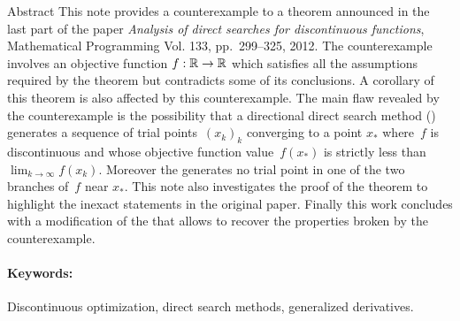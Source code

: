  

\GDcoverpage

\begin{GDtitlepage}

\begin{GDauthlist}
\end{GDauthlist}

\begin{GDaffillist}
\end{GDaffillist}

\begin{GDemaillist}
\end{GDemaillist}

\end{GDtitlepage}


\GDabstracts

\begin{GDabstract}{Abstract}
This note provides a counterexample to a theorem announced in the last part of the paper \textit{Analysis of direct searches for discontinuous functions}, Mathematical Programming Vol. 133, pp.~299--325, 2012.
The counterexample involves an objective function $f: \mathbb{R} \to \mathbb{R}$ which satisfies all the assumptions required by the theorem but contradicts some of its conclusions.
A corollary of this theorem is also affected by this counterexample.
The main flaw revealed by the counterexample is the possibility that a directional direct search method (\ddsm) generates a sequence of trial points~$(x_k)_k$ converging to a point $x_*$ where~$f$ is discontinuous and whose objective function value~$f(x_*)$ is strictly less than $\lim_{k\to\infty} f(x_k)$.
Moreover the \ddsm generates no trial point in one of the two branches of~$f$ near $x_*$.
This note also investigates the proof of the theorem to highlight the inexact statements in the original paper.
Finally this work concludes with a modification of the \ddsm that allows to recover the properties broken by the counterexample.

\paragraph{Keywords:} Discontinuous optimization, direct search methods, generalized derivatives.

\end{GDabstract}

